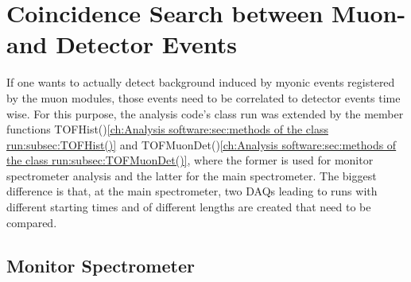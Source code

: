  \section{Coincidence Search between Muon- and Detector Events}
  \label{ch:Analysis:sec:Monitor Spectrometer Measurements}
  If one wants to actually detect background induced by myonic events registered by the muon modules, those events need to be correlated to detector events time wise. For this purpose, the analysis code's class run was extended by the member functions TOFHist()\ref{ch:Analysis software:sec:methods of the class run:subsec:TOFHist()} and TOFMuonDet()\ref{ch:Analysis software:sec:methods of the class run:subsec:TOFMuonDet()}, where the former is used for monitor spectrometer analysis and the latter for the main spectrometer. The biggest difference is that, at the main spectrometer, two DAQs leading to runs with different starting times and of different lengths are created that need to be compared. 
  
  \subsection{Monitor Spectrometer}
  \label{ch:Analysis:sec:Monitor Spectrometer Measurements:subsec:Monitor Spectrometer}
  
